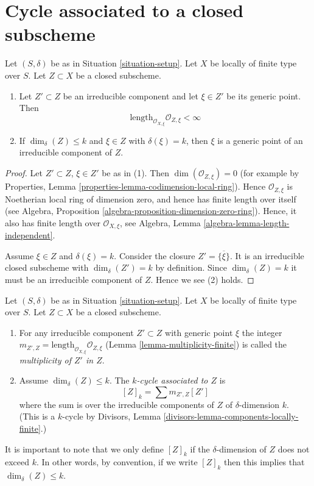 \section{Cycle associated to a closed subscheme}
\label{section-cycle-of-closed-subscheme}

\begin{lemma}
\label{lemma-multiplicity-finite}
Let $(S, \delta)$ be as in Situation \ref{situation-setup}.
Let $X$ be locally of finite type over $S$.
Let $Z \subset X$ be a closed subscheme.
\begin{enumerate}
\item Let $Z' \subset Z$ be an irreducible component and
let $\xi \in Z'$ be its generic point.
Then
$$
\text{length}_{\mathcal{O}_{X, \xi}} \mathcal{O}_{Z, \xi} < \infty
$$
\item If $\dim_\delta(Z) \leq k$ and $\xi \in Z$ with
$\delta(\xi) = k$, then $\xi$ is a generic point of an
irreducible component of $Z$.
\end{enumerate}
\end{lemma}

\begin{proof}
Let $Z' \subset Z$, $\xi \in Z'$ be as in (1).
Then $\dim(\mathcal{O}_{Z, \xi}) = 0$ (for example by
Properties, Lemma \ref{properties-lemma-codimension-local-ring}).
Hence $\mathcal{O}_{Z, \xi}$ is Noetherian
local ring of dimension zero, and hence has finite length over
itself (see
Algebra, Proposition \ref{algebra-proposition-dimension-zero-ring}).
Hence, it also has finite length over $\mathcal{O}_{X, \xi}$, see
Algebra, Lemma \ref{algebra-lemma-length-independent}.

\medskip\noindent
Assume $\xi \in Z$ and $\delta(\xi) = k$.
Consider the closure $Z' = \overline{\{\xi\}}$. It is an irreducible
closed subscheme with $\dim_\delta(Z') = k$ by definition.
Since $\dim_\delta(Z) = k$ it must be an irreducible component
of $Z$. Hence we see (2) holds.
\end{proof}

\begin{definition}
\label{definition-cycle-associated-to-closed-subscheme}
Let $(S, \delta)$ be as in Situation \ref{situation-setup}.
Let $X$ be locally of finite type over $S$.
Let $Z \subset X$ be a closed subscheme.
\begin{enumerate}
\item For any irreducible component $Z' \subset Z$ with generic point $\xi$
the integer
$m_{Z', Z} = \text{length}_{\mathcal{O}_{X, \xi}} \mathcal{O}_{Z, \xi}$
(Lemma \ref{lemma-multiplicity-finite})
is called the {\it multiplicity of $Z'$ in $Z$}.
\item Assume $\dim_\delta(Z) \leq k$.
The {\it $k$-cycle associated to $Z$} is
$$
[Z]_k
=
\sum m_{Z', Z}[Z']
$$
where the sum is over the irreducible components of $Z$
of $\delta$-dimension $k$. (This is a $k$-cycle by
Divisors, Lemma \ref{divisors-lemma-components-locally-finite}.)
\end{enumerate}
\end{definition}

\noindent
It is important to note that we only define $[Z]_k$ if the $\delta$-dimension
of $Z$ does not exceed $k$. In other words, by convention, if we write
$[Z]_k$ then this implies that $\dim_\delta(Z) \leq k$.



